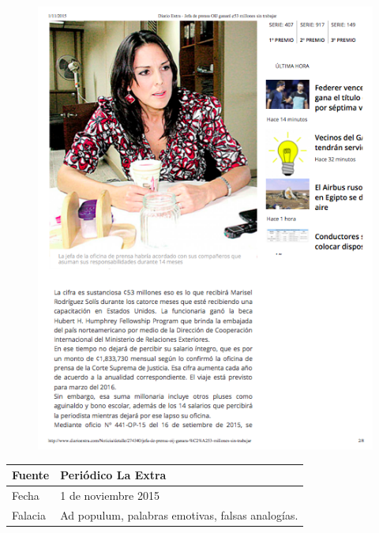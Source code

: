 \documentclass[times]{simauth}
\begin{document}
\begin{figure}[h!]
    \centering
    \includegraphics[width=15cm]{noticiaJefaOIJ}
    \label{fig:falacia3}
\end{figure}

\newpage

\begin{table}[h!]
    \begin{tabular}{ll} 
        \toprule[1.5pt]
        Fuente & Periódico La Extra\\
        \midrule[0.5pt]
        Fecha  & 1 de noviembre 2015\\
        \midrule[0.5pt]
        Falacia & Ad populum, palabras emotivas, falsas analogías. \\
        \bottomrule[1.5pt]
    \end{tabular} 
\end{table}
\end{document}
